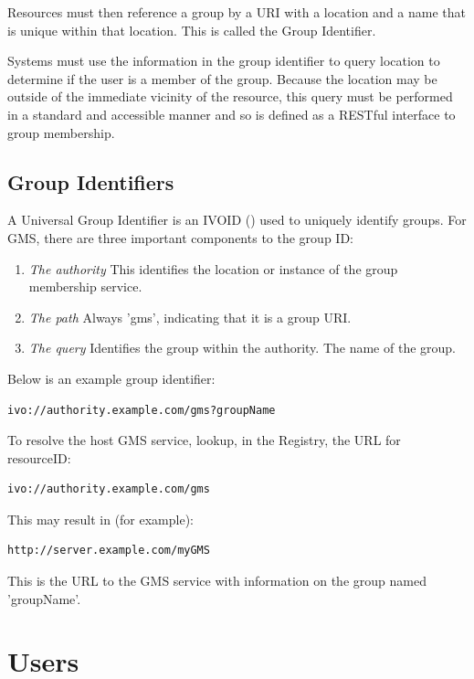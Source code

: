 \documentclass[11pt,a4paper]{ivoa}
\begin{document}
Resources must then reference a group by a URI with a location and a name that is unique within that location.  This is called the Group Identifier.

Systems must use the information in the group identifier to query location to determine if the user is a member of the group.  Because the location may be outside of the immediate vicinity of the resource, this query must be performed in a standard and accessible manner and so is defined as a RESTful interface to group membership. 

\subsection{Group Identifiers}

A Universal Group Identifier is an IVOID (\citep{std:VOID2}) used to uniquely identify groups.  For GMS, there are three important components to the group ID:

\begin{enumerate}
\item \emph{The authority} This identifies the location or instance of the group membership service.
\item \emph{The path} Always 'gms', indicating that it is a group URI.
\item \emph{The query} Identifies the group within the authority.  The name of the group.
\end{enumerate}

Below is an example group identifier:

\begin{verbatim}
ivo://authority.example.com/gms?groupName
\end{verbatim}

To resolve the host GMS service, lookup, in the Registry, the URL for resourceID:

\begin{verbatim}
ivo://authority.example.com/gms
\end{verbatim}

This may result in (for example):

\begin{verbatim}
http://server.example.com/myGMS
\end{verbatim}

This is the URL to the GMS service with information on the group named 'groupName'.



\section{Users}
\end{document}
